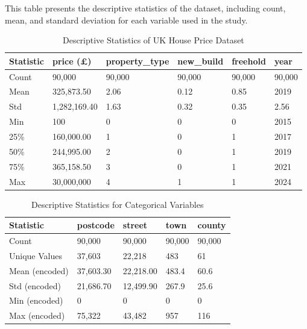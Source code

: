 \documentclass[12pt, a4paper, oneside]{book}
\begin{document}
This table presents the descriptive statistics of the dataset, including count, mean, and standard deviation for each variable used in the study.

\begin{table}[htbp]
\centering
\caption{Descriptive Statistics of UK House Price Dataset}
\label{tab:descriptive_stats}
\footnotesize
\begin{tabular}{|p{2cm}|p{2cm}|p{2cm}|p{2cm}|p{2cm}|p{2cm}|}
\hline
\textbf{Statistic} & \textbf{price (£)} & \textbf{property\_type} & \textbf{new\_build} & \textbf{freehold} & \textbf{year} \\
\hline
Count & 90,000 & 90,000 & 90,000 & 90,000 & 90,000 \\
\hline
Mean & 325,873.50 & 2.06 & 0.12 & 0.85 & 2019 \\
\hline
Std & 1,282,169.40 & 1.63 & 0.32 & 0.35 & 2.56 \\
\hline
Min & 100 & 0 & 0 & 0 & 2015 \\
\hline
25\% & 160,000.00 & 1 & 0 & 1 & 2017 \\
\hline
50\% & 244,995.00 & 2 & 0 & 1 & 2019 \\
\hline
75\% & 365,158.50 & 3 & 0 & 1 & 2021 \\
\hline
Max & 30,000,000 & 4 & 1 & 1 & 2024 \\
\hline
\end{tabular}
\end{table}

\begin{table}[htbp]
\centering
\caption{Descriptive Statistics for Categorical Variables}
\label{tab:categorical_stats}
\footnotesize
\begin{tabular}{|p{2.5cm}|p{2.5cm}|p{2.5cm}|p{2.5cm}|p{2.5cm}|}
\hline
\textbf{Statistic} & \textbf{postcode} & \textbf{street} & \textbf{town} & \textbf{county} \\
\hline
Count & 90,000 & 90,000 & 90,000 & 90,000 \\
\hline
Unique Values & 37,603 & 22,218 & 483 & 61 \\
\hline
Mean (encoded) & 37,603.30 & 22,218.00 & 483.4 & 60.6 \\
\hline
Std (encoded) & 21,686.70 & 12,499.90 & 267.9 & 25.6 \\
\hline
Min (encoded) & 0 & 0 & 0 & 0 \\
\hline
Max (encoded) & 75,322 & 43,482 & 957 & 116 \\
\hline
\end{tabular}
\end{table}
\end{document}
